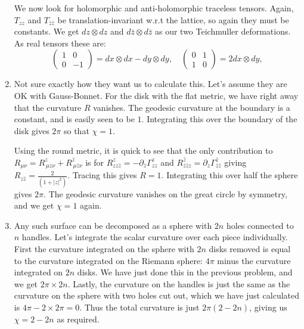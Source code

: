 \documentclass[11pt, class=article, crop=false]{standalone}
\begin{document}
\begin{enumerate}
	 We now look for holomorphic and anti-holomorphic traceless tensors. Again, $T_{zz}$ and $T_{\bar z \bar z}$ be translation-invariant w.r.t the lattice, so again they must be constants. We get $dz \otimes dz$ and $d \bar z \otimes d\bar z$ as our two Teichmuller deformations. As real tensors these are:
	 \[
	 	\begin{pmatrix}
	 		1 & 0\\
			0 & -1
	 	\end{pmatrix} = dx \otimes dx - dy \otimes dy, \quad 
	 	\begin{pmatrix}
	 		0 & 1\\
			1 & 0
	 	\end{pmatrix} = 2 dx \otimes dy ,
	 \]
	 \item Not sure exactly how they want us to calculate this. Let's assume they are OK with Gauss-Bonnet. For the disk with the flat metric, we have right away that the curvature $R$ vanishes. The geodesic curvature at the boundary is a constant, and is easily seen to be $1$. Integrating this over the boundary of the disk gives $2\pi$ so that $\chi=1$. 
	 
	 Using the round metric, it is quick to see that the only contribution to $R_{\mu \nu} = R^z_{\, \mu z \nu} + R^{\bar z}_{\, \mu \bar z \nu}$ is for $R^z_{z z \bar z} = -\partial_{\bar z} \Gamma^z_{z z}$
	  and $R^{\bar z}_{\bar z \bar z z} = \partial_z \Gamma^{\bar z}_{\bar z \bar z}$ giving $R_{z \bar z} = \frac{2}{(1 + |z|^2)}$. Tracing this gives $R = 1$. Integrating this over half the sphere gives $2 \pi$. The geodesic curvature vanishes on the great circle by symmetry, and we get $\chi = 1$ again.
	  
	  \item Any such surface can be decomposed as a sphere with $2n$ holes connected to $n$ handles. Let's integrate the scalar curvature over each piece individually. First the curvature integrated on the sphere with $2n$ disks removed is equal to the curvature integrated on the Riemann sphere: $4\pi$ minus the curvature integrated on $2n$ disks. We have just done this in the previous problem, and we get $2\pi \times 2n$. Lastly, the curvature on the handles is just the same as the curvature on the sphere with two holes cut out, which we have just calculated is $4 \pi - 2 \times 2\pi = 0$. Thus the total curvature is just $2 \pi (2-2n)$, giving us $\chi = 2-2n$ as required. 
	  

\end{enumerate}
\end{document}
